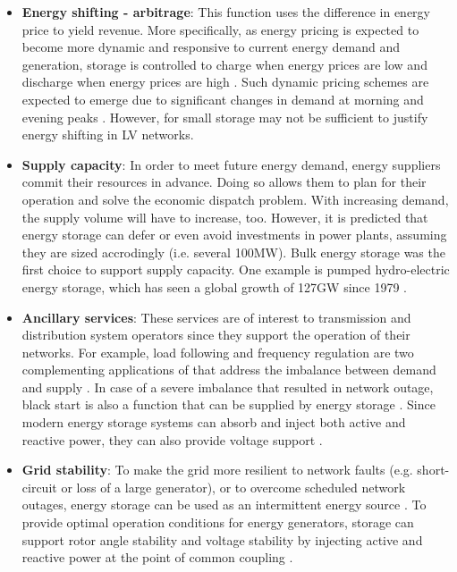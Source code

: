 \begin{itemize}
\item
\textbf{Energy shifting - arbitrage}: This function uses the difference in energy price to yield revenue.
More specifically, as energy pricing is expected to become more dynamic and responsive to current energy demand and generation, storage is controlled to charge when energy prices are low and discharge when energy prices are high \cite{Chen2009, Leou2012}.
Such dynamic pricing schemes are expected to emerge due to significant changes in demand at morning and evening peaks \cite{Koohi-Kamali2013}.
However, for small storage may not be sufficient to justify energy shifting in LV networks.
\item
\textbf{Supply capacity}: In order to meet future energy demand, energy suppliers commit their resources in advance.
Doing so allows them to plan for their operation and solve the economic dispatch problem.
With increasing demand, the supply volume will have to increase, too.
However, it is predicted that energy storage can defer or even avoid investments in power plants, assuming they are sized accrodingly (i.e. several 100MW)\cite{Dobie1998}.
Bulk energy storage was the first choice to support supply capacity.
One example is pumped hydro-electric energy storage, which has seen a global growth of 127GW since 1979 \cite{Rehman2015, Barbour2015, Barbour2016}.
\item
\textbf{Ancillary services}: These services are of interest to transmission and distribution system operators since they support the operation of their networks.
For example, load following and frequency regulation are two complementing applications of that address the imbalance between demand and supply \cite{Bevrani2011}.
In case of a severe imbalance that resulted in network outage, black start is also a function that can be supplied by energy storage \cite{Cole1995, Kashem2007}.
Since modern energy storage systems can absorb and inject both active and reactive power, they can also provide voltage support \cite{Kulkarni2005}.
\item
\textbf{Grid stability}: To make the grid more resilient to network faults (e.g. short-circuit or loss of a large generator), or to overcome scheduled network outages, energy storage can be used as an intermittent energy source \cite{Kundur1993}.
To provide optimal operation conditions for energy generators, storage can support rotor angle stability and voltage stability by injecting active and reactive power at the point of common coupling \cite{Chakraborty2012, Kolluri2002}.

\end{itemize}
